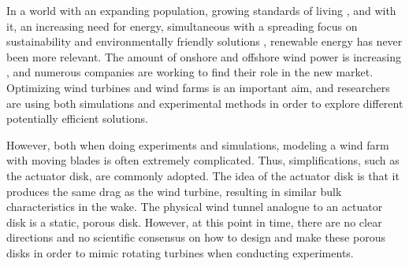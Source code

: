 In a world with an expanding population, growing standards of living \cite{StandardsOfLiving}, and with it, an increasing need for energy, simultaneous with a spreading focus on sustainability and environmentally friendly solutions \cite{sustainabilityFocus} \cite{Veers2019}, renewable energy has never been more relevant. The amount of onshore and offshore wind power is increasing \cite{MoreWind}, and numerous companies are working to find their role in the new market. Optimizing wind turbines and wind farms is an important aim, and researchers are using both simulations and experimental methods in order to explore different potentially efficient solutions. 


However, both when doing experiments and simulations, modeling a wind farm with moving blades is often extremely complicated. Thus, simplifications, such as the actuator disk, are commonly adopted. The idea of the actuator disk is that it produces the same drag as the wind turbine, resulting in similar bulk characteristics in the wake. The physical wind tunnel analogue to an actuator disk is a static, porous disk. However, at this point in time, there are no clear directions and no scientific consensus on how to design and make these porous disks in order to mimic rotating turbines when conducting experiments.  

